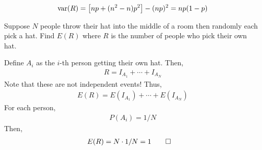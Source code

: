 \begin{solution}
\begin{align}
        \text{var}(R) = \qty[np + (n^2 - n)p^2] - (np)^2 = np(1-p)
    \end{align}
    \begin{example}
        Suppose $N$ people throw their hat into the middle of a room then randomly each pick a hat. Find $E(R)$ where $R$ is the number of people who pick their own hat.
    \end{example}
    \begin{solution}
        Define $A_i$ as the $i$-th person getting their own hat. Then,
        \begin{align}
            R = I_{A_1} + \cdots + I_{A_N}
        \end{align}
        Note that these are not independent events! Thus,
        \begin{align}
            E(R) = E(I_{A_1}) + \cdots + E(I_{A_N})
        \end{align}
        For each person,
        \begin{align}
            P(A_i) = 1/N
        \end{align}
        Then,
        \begin{align}
            E(R) = N \cdot 1/N = 1 & \qedhere
        \end{align}
    \end{solution}
\end{solution}



